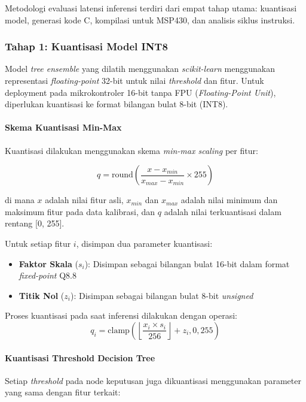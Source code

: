 Metodologi evaluasi latensi inferensi terdiri dari empat tahap utama: kuantisasi model, generasi kode C, kompilasi untuk MSP430, dan analisis siklus instruksi.

\subsubsection{Tahap 1: Kuantisasi Model INT8}

Model \textit{tree ensemble} yang dilatih menggunakan \textit{scikit-learn} menggunakan representasi \textit{floating-point} 32-bit untuk nilai \textit{threshold} dan fitur. Untuk deployment pada mikrokontroler 16-bit tanpa FPU (\textit{Floating-Point Unit}), diperlukan kuantisasi ke format bilangan bulat 8-bit (INT8).

\paragraph{Skema Kuantisasi Min-Max}
Kuantisasi dilakukan menggunakan skema \textit{min-max scaling} per fitur:

\begin{equation}
    q = \text{round}\left(\frac{x - x_{min}}{x_{max} - x_{min}} \times 255\right)
\end{equation}

di mana $x$ adalah nilai fitur asli, $x_{min}$ dan $x_{max}$ adalah nilai minimum dan maksimum fitur pada data kalibrasi, dan $q$ adalah nilai terkuantisasi dalam rentang [0, 255].

Untuk setiap fitur $i$, disimpan dua parameter kuantisasi:
\begin{itemize}
    \item \textbf{Faktor Skala} ($s_i$): Disimpan sebagai bilangan bulat 16-bit dalam format \textit{fixed-point} Q8.8
    \item \textbf{Titik Nol} ($z_i$): Disimpan sebagai bilangan bulat 8-bit \textit{unsigned}
\end{itemize}

Proses kuantisasi pada saat inferensi dilakukan dengan operasi:
\begin{equation}
    q_i = \text{clamp}\left(\left\lfloor\frac{x_i \times s_i}{256}\right\rfloor + z_i, 0, 255\right)
\end{equation}

\paragraph{Kuantisasi Threshold Decision Tree}
Setiap \textit{threshold} pada node keputusan juga dikuantisasi menggunakan parameter yang sama dengan fitur terkait:

